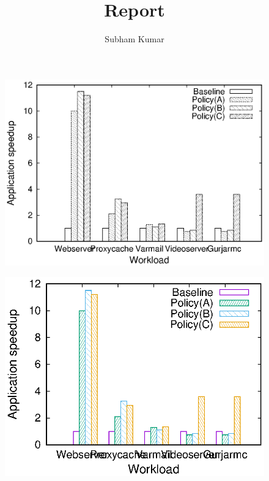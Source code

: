 \documentclass[a4paper, 10pt]{report}
\title{Report}
\author{Subham Kumar}
\date{}
\begin{document}
\maketitle

\listoffigures


 





\begin{figure}
\centering
\includegraphics[width=\columnwidth]{speedup.eps}

 \label{fig:figr1}
\end{figure}





\begin{figure}
\centering

\includegraphics[width=\columnwidth]{speedup_color.eps}
 \label{fig:figr2}
\end{figure}
\end{document}
